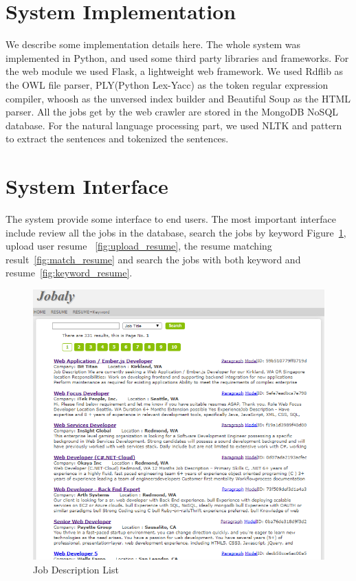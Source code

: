 \section{System Implementation}

We describe some implementation details here. The whole system was implemented in Python, and used some third party libraries and frameworks. For the web module we used Flask, a lightweight web framework. We used Rdflib as the OWL file parser, PLY(Python Lex-Yacc) as the token regular expression compiler, whoosh as the unversed index builder and Beautiful Soup as the HTML parser.  All the jobs get by the web crawler are stored in the MongoDB NoSQL database.  For the natural language processing part, we used NLTK and pattern to extract the sentences and tokenized the sentences.

\section{System Interface}

The system provide some interface to end users. The most important interface include review all the jobs in the database, search the jobs by keyword Figure~\ref{fig:joblist},  upload user resume ~\ref{fig:upload_resume}, the resume matching result~\ref{fig:match_resume} and search the jobs with both keyword and resume~\ref{fig:keyword_resume}.

\begin{figure}[htbp]
  \centering
  \includegraphics[scale=0.5]{images/joblist.png}
  \caption{Job Description List}
  \label{fig:joblist}
\end{figure}


